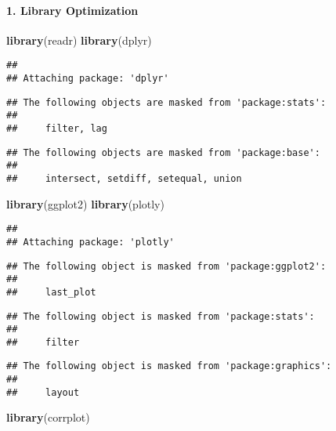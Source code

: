 \documentclass[
]{article}
\newenvironment{Shaded}{\begin{snugshade}}{\end{snugshade}}
\newcommand{\FunctionTok}[1]{\textcolor[rgb]{0.13,0.29,0.53}{\textbf{#1}}}
\newcommand{\NormalTok}[1]{#1}
\begin{document}
\hypertarget{library-optimization}{%
\paragraph{1. Library Optimization}\label{library-optimization}}

\begin{Shaded}
\begin{Highlighting}[]
\FunctionTok{library}\NormalTok{(readr)}
\FunctionTok{library}\NormalTok{(dplyr)}
\end{Highlighting}
\end{Shaded}

\begin{verbatim}
## 
## Attaching package: 'dplyr'
\end{verbatim}

\begin{verbatim}
## The following objects are masked from 'package:stats':
## 
##     filter, lag
\end{verbatim}

\begin{verbatim}
## The following objects are masked from 'package:base':
## 
##     intersect, setdiff, setequal, union
\end{verbatim}

\begin{Shaded}
\begin{Highlighting}[]
\FunctionTok{library}\NormalTok{(ggplot2)}
\FunctionTok{library}\NormalTok{(plotly)}
\end{Highlighting}
\end{Shaded}

\begin{verbatim}
## 
## Attaching package: 'plotly'
\end{verbatim}

\begin{verbatim}
## The following object is masked from 'package:ggplot2':
## 
##     last_plot
\end{verbatim}

\begin{verbatim}
## The following object is masked from 'package:stats':
## 
##     filter
\end{verbatim}

\begin{verbatim}
## The following object is masked from 'package:graphics':
## 
##     layout
\end{verbatim}

\begin{Shaded}
\begin{Highlighting}[]
\FunctionTok{library}\NormalTok{(corrplot)}
\end{Highlighting}
\end{Shaded}
\end{document}
